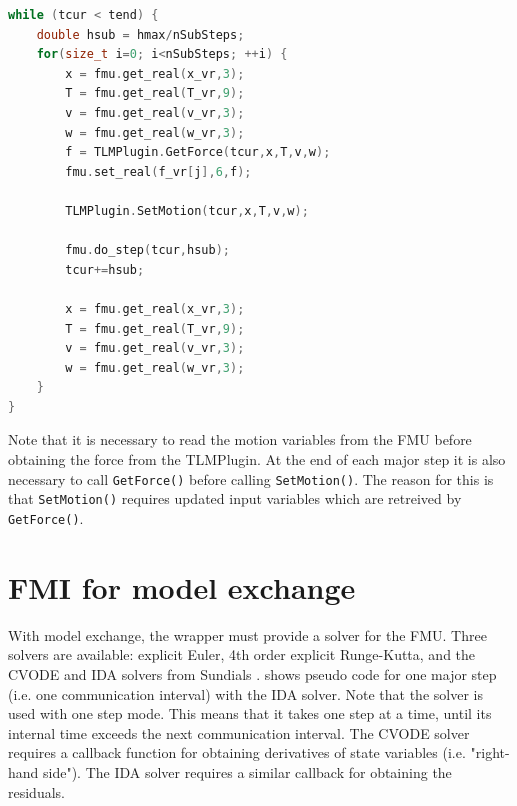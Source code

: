\documentclass[a4paper,12pt]{include/opencpsreport}
\begin{document}
\begin{lstlisting}[language=c++, basicstyle=\ttfamily\small,floatplacement=htb,caption=Pseudo code for the simulation loop with FMI for co-simulation,label=lst:wrapper_cs]
while (tcur < tend) {
    double hsub = hmax/nSubSteps;
    for(size_t i=0; i<nSubSteps; ++i) {
        x = fmu.get_real(x_vr,3);
        T = fmu.get_real(T_vr,9);
        v = fmu.get_real(v_vr,3);
        w = fmu.get_real(w_vr,3);
        f = TLMPlugin.GetForce(tcur,x,T,v,w);
        fmu.set_real(f_vr[j],6,f);
        
        TLMPlugin.SetMotion(tcur,x,T,v,w);

        fmu.do_step(tcur,hsub);
        tcur+=hsub;

        x = fmu.get_real(x_vr,3);
        T = fmu.get_real(T_vr,9);
        v = fmu.get_real(v_vr,3);
        w = fmu.get_real(w_vr,3);
    }
}
\end{lstlisting}

Note that it is necessary to read the motion variables from the FMU before obtaining the force from the TLMPlugin. 
At the end of each major step it is also necessary to call \texttt{GetForce()} before calling \texttt{SetMotion()}.
The reason for this is that \texttt{SetMotion()} requires updated input variables which are retreived by \texttt{GetForce()}.

\vspace{0cm}

\clearpage
\section{FMI for model exchange}
\label{sec:fmi_me}
With model exchange, the wrapper must provide a solver for the FMU.
Three solvers are available: explicit Euler, 4th order explicit Runge-Kutta, and the CVODE and IDA solvers from Sundials \cite{hindmarsh2005}.
 shows pseudo code for one major step (i.e. one communication interval) with the IDA solver.
Note that the solver is used with one step mode.
This means that it takes one step at a time, until its internal time exceeds the next communication interval.
The CVODE solver requires a callback function for obtaining derivatives of state variables (i.e. "right-hand side").
The IDA solver requires a similar callback for obtaining the residuals.
\end{document}
